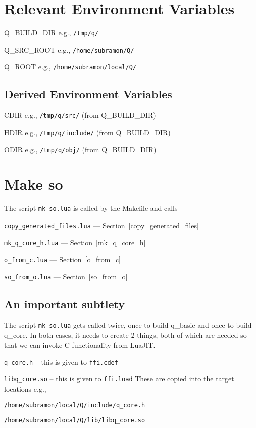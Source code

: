 
\section{Relevant Environment Variables}
\be
\item Q\_BUILD\_DIR e.g., \verb+/tmp/q/+
\item Q\_SRC\_ROOT e.g., \verb+/home/subramon/Q/+
\item Q\_ROOT e.g., \verb+/home/subramon/local/Q/+
\ee

\subsection{Derived Environment Variables}
\be
\item CDIR e.g., \verb+/tmp/q/src/+ (from Q\_BUILD\_DIR)
\item HDIR e.g., \verb+/tmp/q/include/+ (from Q\_BUILD\_DIR)
\item ODIR e.g., \verb+/tmp/q/obj/+ (from Q\_BUILD\_DIR)
\ee

\section{Make so}

The script {\tt mk\_so.lua} is called by the Makefile and calls
\be 
\item {\tt copy\_generated\_files.lua} --- 
Section~\ref{copy_generated_files}
\item {\tt mk\_q\_core\_h.lua} --- Section~\ref{mk_q_core_h}
\item {\tt o\_from\_c.lua} --- Section~\ref{o_from_c}
\item {\tt so\_from\_o.lua} --- Section~\ref{so_from_o}
\ee

\subsection{An important subtlety}

The script \verb+mk_so.lua+ gets called twice, 
once to build q\_basic and once to build q\_core.
In both cases, it needs to create 2 things, both of which are needed so that we
can invoke C functionality from LuaJIT.
\be
\item \verb+q_core.h+ -- this is given to {\tt ffi.cdef}
\item \verb+libq_core.so+ -- this is given to {\tt ffi.load}
\ee
These are copied into the target locations e.g.,
\be
\item \verb+/home/subramon/local/Q/include/q_core.h+
\item \verb+/home/subramon/local/Q/lib/libq_core.so+
\ee

